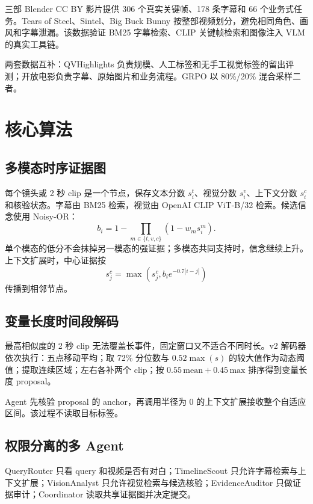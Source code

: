 \documentclass[UTF8,letterpaper,10pt,twocolumn]{ctexart}
\begin{document}
三部 Blender CC BY 影片提供 306 个真实关键帧、178 条字幕和 66 个业务式任务。Tears of Steel、Sintel、Big Buck Bunny 按整部视频划分，避免相同角色、画风和字幕泄漏。该数据验证 BM25 字幕检索、CLIP 关键帧检索和图像注入 VLM 的真实工具链。

两套数据互补：QVHighlights 负责规模、人工标签和无手工视觉标签的留出评测；开放电影负责字幕、原始图片和业务流程。GRPO 以 80\%/20\% 混合采样二者。

\section{核心算法}

\subsection{多模态时序证据图}

每个镜头或 2 秒 clip 是一个节点，保存文本分数 $s_i^t$、视觉分数 $s_i^v$、上下文分数 $s_i^c$ 和核验状态。字幕由 BM25 检索，视觉由 OpenAI CLIP ViT-B/32 检索。候选信念使用 Noisy-OR：
\begin{equation}
b_i=1-\prod_{m\in\{t,v,c\}}(1-w_m s_i^m).
\end{equation}
单个模态的低分不会抹掉另一模态的强证据；多模态共同支持时，信念继续上升。上下文扩展时，中心证据按
\begin{equation}
s_j^c=\max\left(s_j^c,b_i e^{-0.7|i-j|}\right)
\end{equation}
传播到相邻节点。

\subsection{变量长度时间段解码}

最高相似度的 2 秒 clip 无法覆盖长事件，固定窗口又不适合不同时长。v2 解码器依次执行：五点移动平均；取 72\% 分位数与 $0.52\max(s)$ 的较大值作为动态阈值；提取连续区域；左右各补两个 clip；按 $0.55\,\mathrm{mean}+0.45\,\mathrm{max}$ 排序得到变量长度 proposal。

Agent 先核验 proposal 的 anchor，再调用半径为 0 的上下文扩展接收整个自适应区间。该过程不读取目标标签。

\subsection{权限分离的多 Agent}

QueryRouter 只看 query 和视频是否有对白；TimelineScout 只允许字幕检索与上下文扩展；VisionAnalyst 只允许视觉检索与候选核验；EvidenceAuditor 只做证据审计；Coordinator 读取共享证据图并决定提交。
\end{document}
